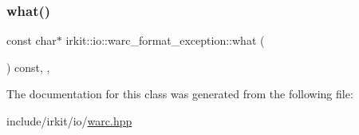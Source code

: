 \mbox{\label{classirkit_1_1io_1_1warc__format__exception_ad695c110c2550618c457929469adcb0a}} 
\subsubsection{\texorpdfstring{what()}{what()}}
{\footnotesize\ttfamily const char$\ast$ irkit\+::io\+::warc\+\_\+format\+\_\+exception\+::what (\begin{DoxyParamCaption}{ }\end{DoxyParamCaption}) const\hspace{0.3cm}{\ttfamily [inline]}, {\ttfamily [override]}, {\ttfamily [noexcept]}}



The documentation for this class was generated from the following file\+:\begin{DoxyCompactItemize}
\item 
include/irkit/io/\mbox{\hyperlink{warc_8hpp}{warc.\+hpp}}\end{DoxyCompactItemize}
